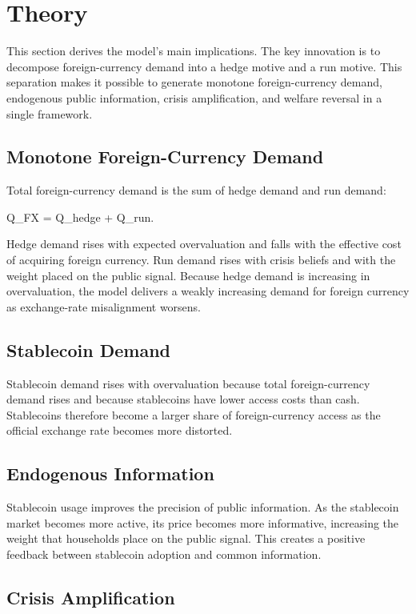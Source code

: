 \section{Theory}\label{sec:theory}

This section derives the model's main implications. The key innovation is to decompose foreign-currency demand into a hedge motive and a run motive. This separation makes it possible to generate monotone foreign-currency demand, endogenous public information, crisis amplification, and welfare reversal in a single framework.

\subsection{Monotone Foreign-Currency Demand}

Total foreign-currency demand is the sum of hedge demand and run demand:

Q_FX = Q_hedge + Q_run.

Hedge demand rises with expected overvaluation and falls with the effective cost of acquiring foreign currency. Run demand rises with crisis beliefs and with the weight placed on the public signal. Because hedge demand is increasing in overvaluation, the model delivers a weakly increasing demand for foreign currency as exchange-rate misalignment worsens.

\subsection{Stablecoin Demand}

Stablecoin demand rises with overvaluation because total foreign-currency demand rises and because stablecoins have lower access costs than cash. Stablecoins therefore become a larger share of foreign-currency access as the official exchange rate becomes more distorted.

\subsection{Endogenous Information}

Stablecoin usage improves the precision of public information. As the stablecoin market becomes more active, its price becomes more informative, increasing the weight that households place on the public signal. This creates a positive feedback between stablecoin adoption and common information.

\subsection{Crisis Amplification}

